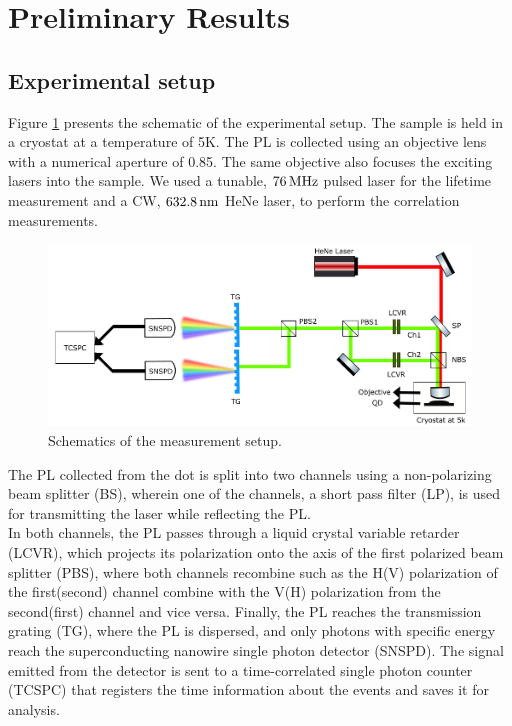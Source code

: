 \section{Preliminary Results}
\subsection{Experimental setup}
Figure \ref{fig:experiment_schematics} presents the schematic of the experimental setup. The sample is held in a cryostat  at a temperature of 5K. The PL is collected using an objective lens with a numerical aperture of 0.85. The same objective also focuses the exciting lasers into the sample. We used a tunable, $76\,\rm MHz$ pulsed laser for the lifetime measurement and a CW, $632.8\,\rm nm$ HeNe laser, to perform the correlation measurements. \\
	\begin{figure}[H]
		\centering
		\includegraphics[scale=0.60]{figures/Experiment_schematics.png}
		\caption{Schematics of the measurement setup.}
		\label{fig:experiment_schematics}
	\end{figure}
The PL collected from the dot is split into two channels using a non-polarizing beam splitter (BS), wherein one of the channels, a short pass filter (LP), is used for transmitting the laser while reflecting the PL.\\
In both channels, the PL passes through a liquid crystal variable retarder (LCVR), which projects its polarization onto the axis of the first polarized beam splitter (PBS), where both channels recombine such as the H(V) polarization of the first(second) channel combine with the V(H) polarization from the second(first) channel and vice versa. Finally, the PL reaches the transmission grating (TG), where the PL is dispersed, and only photons with specific energy reach the superconducting nanowire single photon detector (SNSPD). The signal emitted from the detector is sent to a time-correlated single photon counter (TCSPC) that registers the time information about the events and saves it for analysis. 
